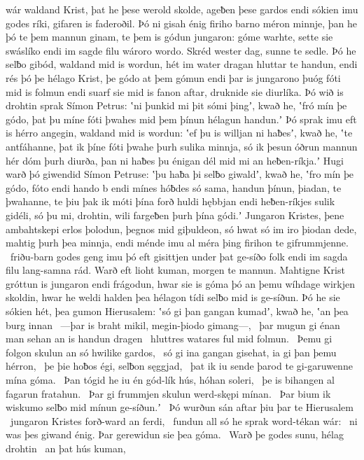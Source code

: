 wár waldand Krist, þat he þese werold skolde,
ageƀen þese gardos endi sókien imu godes ríki,
gifaren is faderoðil. Þó ni gisah énig firiho barno
méron minnje, þan he þó te þem mannun ginam,
te þem is gódun jungaron: góme warhte,
sette sie swáslíko endi im sagde filu
wároro wordo. Skréd wester dag,
sunne te sedle. Þó he selƀo gibód,
waldand mid is wordun, hét im water dragan
hluttar te handun, endi rés þó þe hélago Krist,
þe gódo at þem gómun endi þar is jungarono þuóg
fóti mid is folmun endi suarf sie mid is fanon aftar,
druknide sie diurlíka. Þó wið is drohtin sprak
Símon Petrus: ʽni þunkid mi þit sómi þingʼ, kwað he,
ʽfró mín þe gódo, þat þu míne fóti þwahes
mid þem þínun hélagun handun.ʼ Þó sprak imu eft is hérro angegin,
waldand mid is wordun: ʽef þu is willjan ni haƀesʼ, kwað he,
ʽte antfáhanne, þat ik þíne fóti þwahe
þurh sulika minnja, só ik þesun óðrun mannun hér
dóm þurh diurða, þan ni haƀes þu énigan dél mid mi
an heƀen-ríkja.ʼ Hugi warð þó giwendid
Símon Petruse: ʽþu haƀa þi selƀo giwaldʼ, kwað he,
ʽfro mín þe gódo, fóto endi hando
b endi mínes hóƀdes só sama, handun þínun,
þiadan, te þwahanne, te þiu þak ik móti þína forð
huldi hębbjan endi heƀen-ríkjes
sulik gidéli, só þu mi, drohtin, wili
fargeƀen þurh þína gódi.ʼ Jungaron Kristes,
þene ambahtskepi erlos þolodun,
þegnos mid giþuldeon, só hwat só im iro þiodan dede,
mahtig þurh þea minnja, endi ménde imu al méra þing
firihon te gifrummjenne. \hld\ friðu-barn godes
geng imu þó eft gisittjen under þat ge-síðo folk
endi im sagda filu lang-samna rád. Warð eft lioht kuman,
morgen te mannun. Mahtigne Krist
gróttun is jungaron endi frágodun, hwar sie is góma þó
an þemu wíhdage wirkjen skoldin,
hwar he weldi halden þea hélagon tídi
selƀo mid is ge-síðun. Þó he sie sókien hét,
þea gumon Hierusalem: ʽsó gi þan gangan kumadʼ, kwað he,
ʽan þea burg innan \hld\ —þar is braht mikil,
megin-þiodo gimang—, \hld\ þar mugun gi énan man sehan
an is handun dragen \hld\ hluttres watares
ful mid folmun. \hld\ Þemu gi folgon skulun
an só hwilike gardos, \hld\ só gi ina gangan gisehat,
ia gi þan þemu hérron, \hld\ þe þie hoƀos égi,
selƀon sęggjad, \hld\ þat ik iu sende þarod
te gi-garuwenne mína góma. \hld\ Þan tógid he iu én gód-lík hús,
hóhan soleri, \hld\ þe is bihangen al
fagarun fratahun. \hld\ Þar gi frummjen skulun
werd-skępi mínan. \hld\ Þar bium ik wiskumo
selƀo mid mínun ge-síðun.ʼ \hld\ Þó wurðun sán aftar þiu
þar te Hierusalem \hld\ jungaron Kristes
forð-ward an ferdi, \hld\ fundun all só he sprak
word-tékan wár: \hld\ ni was þes giwand énig.
Þar gerewidun sie þea góma. \hld\ Warð þe godes sunu,
hélag drohtin \hld\ an þat hús kuman,
